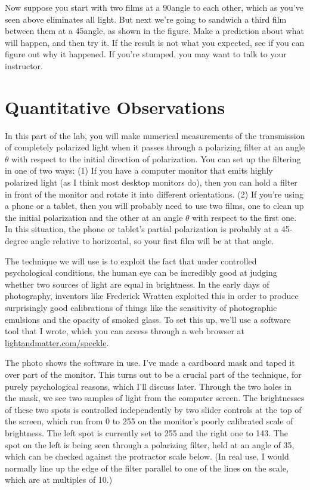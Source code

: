 Now suppose you start with two films at a 90\degunit angle
to each other, which as you've seen above eliminates all light.
But next we're going to sandwich a third film between them
at a 45\degunit angle, as shown in the figure.
Make a prediction about what will happen, and then try it.
If the result is not what you expected, see if you can figure
out why it happened. If you're stumped, you may want to talk to
your instructor.

\section{Quantitative Observations}


In this part of the lab, you will make numerical measurements
of the transmission of completely polarized light when it passes
through a polarizing filter at an angle $\theta$ with respect to the
initial direction of polarization. You can set up the filtering
in one of two ways: (1) If you have a computer monitor that emits highly
polarized light (as I think most desktop monitors do), then you can hold
a filter in front of the monitor and rotate it into different orientations.
(2) If you're using a phone or a tablet, then you will probably need to
use two films, one to clean up the initial polarization and the other
at an angle $\theta$ with respect to the first one. In this situation,
the phone or tablet's partial polarization is probably at a 45-degree angle
relative to horizontal, so your first film will be at that angle.

The technique we will use is to exploit the fact that under controlled
psychological conditions, the human eye can be incredibly good at
judging whether two sources of light are equal in brightness. In the
early days of photography, inventors like Frederick Wratten exploited
this in order to produce surprisingly good calibrations of things like
the sensitivity of photographic emulsions and the opacity of smoked
glass. To set this up, we'll use a software tool that I wrote, which
you can access through a web browser at \url{lightandmatter.com/speckle}.


The photo shows the software in use. I've made a cardboard mask and taped
it over part of the monitor. This turns out to be a crucial part of
the technique, for purely psychological reasons, which I'll discuss later. Through the two holes in
the mask, we see two samples of light from the computer screen. The brightnesses
of these two spots is controlled independently by two slider controls at the top
of the screen, which run from 0 to 255 on the monitor's poorly calibrated scale
of brightness. The left spot is currently set to 255 and the right one to 143.
The spot on the left is being seen through
a polarizing filter, held at an angle of 35\degunit, which can be checked against the
protractor scale below. (In real use, I would normally line up the edge of the filter
parallel to one of the lines on the scale, which are at multiples of 10\degunit.)

